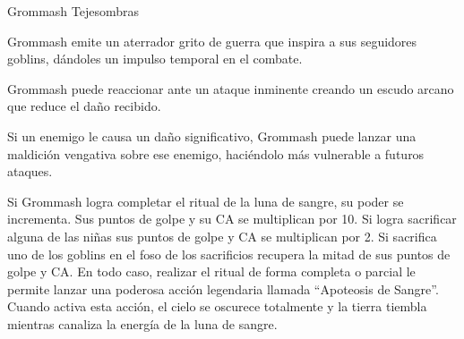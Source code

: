 \documentclass[10pt,twoside,twocolumn,openany]{dndbook}
\begin{document}
\begin{DndMonster}[float*=b,width=\textwidth + 8pt]{Grommash Tejesombras}
\begin{multicols}{2}
    Grommash emite un aterrador grito de guerra que inspira a sus seguidores goblins, dándoles un impulso 
    temporal en el combate.




    Grommash puede reaccionar ante un ataque inminente creando un escudo arcano que reduce el daño recibido.

    Si un enemigo le causa un daño significativo, Grommash puede lanzar una maldición vengativa sobre ese enemigo, 
    haciéndolo más vulnerable a futuros ataques.

    Si Grommash logra completar el ritual de la luna de sangre, su poder se incrementa. Sus puntos de golpe y su CA se 
    multiplican por 10. Si logra sacrificar alguna de las niñas sus puntos de golpe y CA se multiplican por 2. Si sacrifica uno
    de los goblins en el foso de los sacrificios recupera la mitad de sus puntos de golpe y CA. En todo caso, realizar el 
    ritual de forma completa o parcial le permite lanzar una poderosa acción legendaria llamada ``Apoteosis de Sangre''. 
    Cuando activa esta acción, el cielo se oscurece totalmente y la tierra tiembla mientras canaliza la energía de la luna 
    de sangre.


\end{multicols}
\end{DndMonster}
\end{document}

